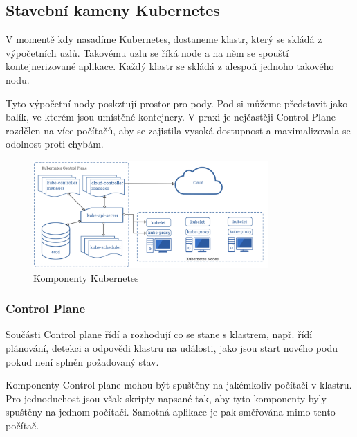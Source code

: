 \subsection{Stavební kameny Kubernetes}

V momentě kdy nasadíme Kubernetes, dostaneme klastr, který se skládá z výpočetních uzlů. Takovému uzlu se říká node a na něm se spouští kontejnerizované aplikace. Každý klastr se skládá z alespoň jednoho takového nodu. 

Tyto výpočetní nody poskztují prostor pro pody. Pod si můžeme představit jako balík, ve kterém jsou umístěné kontejnery. V praxi je nejčastěji Control Plane rozdělen na více počítačů, aby se zajistila vysoká dostupnost a maximalizovala se odolnost proti chybám. 

\begin{figure}[!h]
	\centering
 	\includegraphics[width=0.8\textwidth, angle=0]{kubernetes-architecture.png}
 	\caption[Komponenty Kubernetes]{Komponenty Kubernetes}\label{fig:float}
\end{figure}

\subsubsection{Control Plane}

Součásti Control plane řídí a rozhodují co se stane s klastrem, např. řídí plánování, detekci a odpovědi klastru na události, jako jsou start nového podu pokud není splněn požadovaný stav. 

Komponenty Control plane mohou být spuštěny na jakémkoliv počítači v klastru. Pro jednoduchost jsou však skripty napsané tak, aby tyto komponenty byly spuštěny na jednom počítači. Samotná aplikace je pak směřována mimo tento počítač. 

